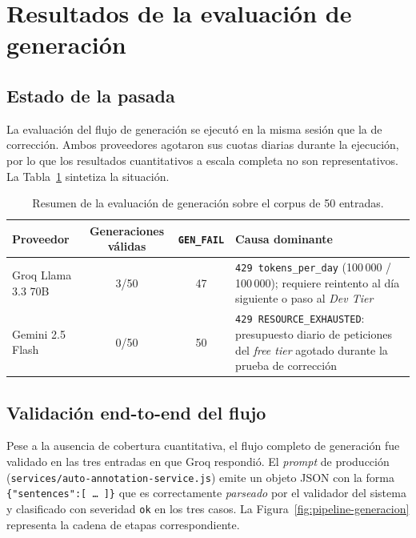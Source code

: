 \section{Resultados de la evaluación de generación}

\subsection{Estado de la pasada}

La evaluación del flujo de generación se ejecutó en la misma sesión que la de
corrección. Ambos proveedores agotaron sus cuotas diarias durante la ejecución,
por lo que los resultados cuantitativos a escala completa no son
representativos. La Tabla~\ref{tab:resultados-generacion} sintetiza la
situación.

\begin{table}[ht]
	\centering
	\small
	\begin{tabular}{lccp{5.5cm}}
		\hline
		\textbf{Proveedor} & \textbf{Generaciones válidas} & \textbf{\texttt{GEN\_FAIL}} & \textbf{Causa dominante}                                                                                                          \\
		\hline
		Groq Llama 3.3 70B & 3/50                          & 47                          & \texttt{429 tokens\_per\_day} (100\,000 / 100\,000); requiere reintento al día siguiente o paso al \textit{Dev Tier}              \\
		Gemini 2.5 Flash   & 0/50                          & 50                          & \texttt{429 RESOURCE\_EXHAUSTED}: presupuesto diario de peticiones del \textit{free tier} agotado durante la prueba de corrección \\
		\hline
	\end{tabular}
	\caption{Resumen de la evaluación de generación sobre el corpus de 50
		entradas.}
	\label{tab:resultados-generacion}
\end{table}

\subsection{Validación end-to-end del flujo}

Pese a la ausencia de cobertura cuantitativa, el flujo completo de generación
fue validado en las tres entradas en que Groq respondió. El \textit{prompt} de
producción (\texttt{services/auto-annotation-service.js}) emite un objeto JSON
con la forma \texttt{\{"sentences":[\,\dots\,]\}} que es correctamente
\textit{parseado} por el validador del sistema y clasificado con severidad
\texttt{ok} en los tres casos. La Figura~\ref{fig:pipeline-generacion}
representa la cadena de etapas correspondiente.

